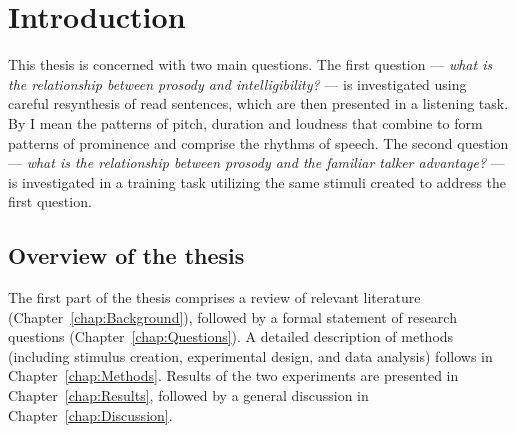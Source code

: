 \chapter{Introduction}
This thesis is concerned with two main questions.  The first question — \emph{what is the relationship between prosody and intelligibility?} — is investigated using careful resynthesis of read sentences, which are then presented in a listening task.  By  I mean the patterns of pitch, duration and loudness that combine to form patterns of prominence and comprise the rhythms of speech.  The second question — \emph{what is the relationship between prosody and the familiar talker advantage?} — is investigated in a training task utilizing the same stimuli created to address the first question.  

\section[Overview]{Overview of the thesis \label{sec:Overview}}
The first part of the thesis comprises a review of relevant literature (Chapter~\ref{chap:Background}), followed by a formal statement of research questions (Chapter~\ref{chap:Questions}).  A detailed description of methods (including stimulus creation, experimental design, and data analysis) follows in Chapter~\ref{chap:Methods}.  Results of the two experiments are presented in Chapter~\ref{chap:Results}, followed by a general discussion in Chapter~\ref{chap:Discussion}.

